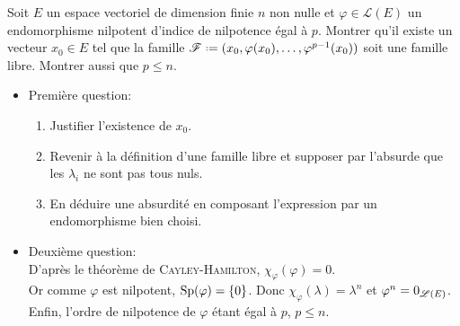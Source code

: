 \begin{exercice}
    Soit $E$ un espace vectoriel de dimension finie $n$ non nulle et $\varphi \in \mathscr{L}(E)$ un endomorphisme nilpotent d'indice de nilpotence égal à $p$. Montrer qu'il existe un vecteur $x_0 \in E$ tel que la famille $\mathscr{F} \defeq (x_0, \varphi(x_0), \dots, \varphi^{p-1}(x_0))$ soit une famille libre. Montrer aussi que $p \leqslant n$. 
\end{exercice}    

\begin{preuve}
    \begin{itemize}
        \item Première question:
        \begin{enumerate}
            \item Justifier l'existence de $x_0$.
            \item Revenir à la définition d'une famille libre et supposer par l'absurde que les $\lambda_i$ ne sont pas tous nuls. 
            \item En déduire une absurdité en composant l'expression par un endomorphisme bien choisi.
        \end{enumerate}
        \item Deuxième question:\\
            D'après le théorème de \textsc{Cayley}-\textsc{Hamilton}, $\chi_{\varphi}(\varphi) = 0$. \\
            Or comme $\varphi$ est nilpotent, $\mathrm{Sp}(\varphi) = \{0\}$. Donc $\chi_{\varphi}(\lambda) = \lambda^n$ et $\varphi^n = 0_{\mathscr{L}(E)}$. Enfin, l'ordre de nilpotence de $\varphi$ étant égal à $p$, $p \leqslant n$.
    \end{itemize}
\end{preuve}

